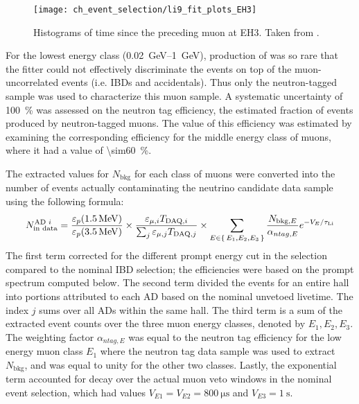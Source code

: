 \begin{figure}
    \centering
    \texttt{[image: ch\_event\_selection/li9\_fit\_plots\_EH3]}
    \caption{
        Histograms of time since the preceding muon at EH3.
        Taken from \cite{jinjing_2020may}.
    }
    \label{fig:li9_fits_EH3}
\end{figure}
For the lowest energy class (\SIrange{0.02}{1}{\GeV}),
production of \li{} was so rare that the fitter
could not effectively discriminate the \li{} events
on top of the muon-uncorrelated events (i.e. IBDs and accidentals).
Thus only the neutron-tagged sample was used to characterize this muon sample.
A systematic uncertainty of \SI{100}{\percent} was assessed
on the neutron tag efficiency,
the estimated fraction of \li{} events produced by neutron-tagged muons.
The value of this efficiency was estimated by examining
the corresponding efficiency for the middle energy class of muons,
where it had a value of \SI{\sim60}{\percent}.

The extracted values for $N_\text{bkg}$ for each class of muons
were converted into the number of \li{} events
actually contaminating the neutrino candidate data sample
using the following formula:
\begin{equation}\label{eq:li9_rate_conv}
    N_\text{in data}^{\text{AD }i} =
    \frac{\varepsilon_p(\SI{1.5}{\MeV})}{\varepsilon_p(\SI{3.5}{\MeV})}
    \times
    \frac{\varepsilon_{\mu,i} T_{\text{DAQ},i}}{
        \sum_j \varepsilon_{\mu,j} T_{\text{DAQ},j}
    }
    \times
    \sum_{E\in\set{E_1,E_2,E_3}}
    \frac{N_{\text{bkg},E}}{\alpha_{ntag, E}} e^{-V_E/\tau_{\text{Li}}}
\end{equation}
The first term corrected for the different prompt energy cut
in the \li{} selection compared to the nominal IBD selection;
the efficiencies were based on the \li{} prompt spectrum computed below.
The second term divided the events for an entire hall
into portions attributed to each AD based on the nominal unvetoed livetime.
The index $j$ sums over all ADs within the same hall.
The third term is a sum of the extracted event counts
over the three muon energy classes, denoted by $E_1,E_2,E_3$.
The weighting factor $\alpha_{ntag,E}$ was equal to
the neutron tag efficiency for the low energy muon class $E_1$
where the neutron tag data sample was used to extract $N_\text{bkg}$,
and was equal to unity for the other two classes.
Lastly, the exponential term accounted for \li{} decay
over the actual muon veto windows in the nominal event selection,
which had values $V_{E1} = V_{E2} = \SI{800}{\us}$
and $V_{E3} = \SI{1}{\s}$.

